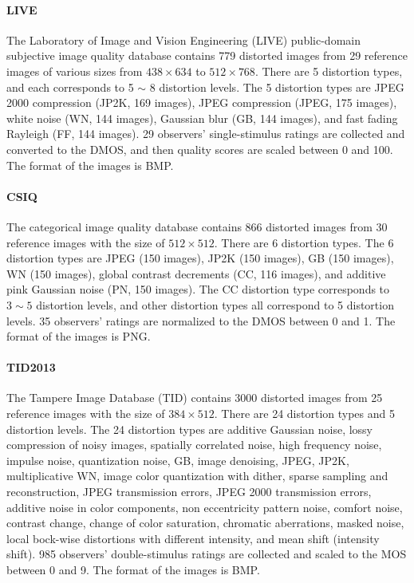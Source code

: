 \paragraph{LIVE} The Laboratory of Image and Vision Engineering (LIVE) public-domain subjective image quality database contains 779 distorted images from 29 reference images of various sizes from $438 \times 634$ to $512 \times 768$. There are 5 distortion types, and each corresponds to 5 $\sim$ 8 distortion levels. The 5 distortion types are JPEG 2000 compression (JP2K, 169 images), JPEG compression (JPEG, 175 images), white noise (WN, 144 images), Gaussian blur (GB, 144 images), and fast fading Rayleigh (FF, 144 images). 29 observers' single-stimulus ratings are collected and converted to the DMOS, and then quality scores are scaled between 0 and 100. The format of the images is BMP.

\paragraph{CSIQ} The categorical image quality database contains 866 distorted images from 30 reference images with the size of $512 \times 512$. There are 6 distortion types. The 6 distortion types are JPEG (150 images), JP2K (150 images), GB (150 images), WN (150 images), global contrast decrements (CC, 116 images), and additive pink Gaussian noise (PN, 150 images). The CC distortion type corresponds to $3 \sim 5$ distortion levels, and other distortion types all correspond to 5 distortion levels. 35 observers' ratings are normalized to the DMOS between 0 and 1. The format of the images is PNG.

\paragraph{TID2013} The Tampere Image Database (TID) contains 3000 distorted images from 25 reference images with the size of $384 \times 512$. There are 24 distortion types and 5 distortion levels. The 24 distortion types are additive Gaussian noise, lossy compression of noisy images, spatially correlated noise, high frequency noise, impulse noise, quantization noise, GB, image denoising, JPEG, JP2K, multiplicative WN, image color quantization with dither, sparse sampling and reconstruction, JPEG transmission errors, JPEG 2000 transmission errors, additive noise in color components, non eccentricity pattern noise, comfort noise, contrast change, change of color saturation, chromatic aberrations, masked noise, local bock-wise distortions with different intensity, and mean shift (intensity shift). 985 observers' double-stimulus ratings are collected and scaled to the MOS between 0 and 9. The format of the images is BMP.

